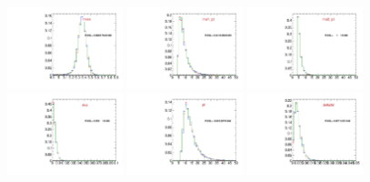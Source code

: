 \begin{figure}
  \includegraphics[width=0.3\textwidth]{Figures/VariablesComparison/MC_endcaps_figs_3h/mass}
  \includegraphics[width=0.3\textwidth]{Figures/VariablesComparison/MC_endcaps_figs_3h/mu1_pt}
  \includegraphics[width=0.3\textwidth]{Figures/VariablesComparison/MC_endcaps_figs_3h/mu2_pt}
  \includegraphics[width=0.3\textwidth]{Figures/VariablesComparison/MC_endcaps_figs_3h/dca}
  \includegraphics[width=0.3\textwidth]{Figures/VariablesComparison/MC_endcaps_figs_3h/pt}
  \includegraphics[width=0.3\textwidth]{Figures/VariablesComparison/MC_endcaps_figs_3h/delta3d}

\end{figure}
